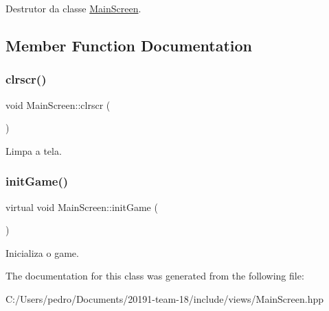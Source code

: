 Destrutor da classe \mbox{\hyperlink{class_main_screen}{Main\+Screen}}. 



\subsection{Member Function Documentation}
\mbox{\label{class_main_screen_ac3fa0644a44436d74b96c68064edbcb4}} 
\subsubsection{\texorpdfstring{clrscr()}{clrscr()}}
{\footnotesize\ttfamily void Main\+Screen\+::clrscr (\begin{DoxyParamCaption}{ }\end{DoxyParamCaption})\hspace{0.3cm}{\ttfamily [protected]}}



Limpa a tela. 

\mbox{\label{class_main_screen_a26e54b5922d5ffec7483309a14d0f55a}} 
\subsubsection{\texorpdfstring{initGame()}{initGame()}}
{\footnotesize\ttfamily virtual void Main\+Screen\+::init\+Game (\begin{DoxyParamCaption}{ }\end{DoxyParamCaption})\hspace{0.3cm}{\ttfamily [virtual]}}



Inicializa o game. 



The documentation for this class was generated from the following file\+:\begin{DoxyCompactItemize}
\item 
C\+:/\+Users/pedro/\+Documents/20191-\/team-\/18/include/views/Main\+Screen.\+hpp\end{DoxyCompactItemize}
